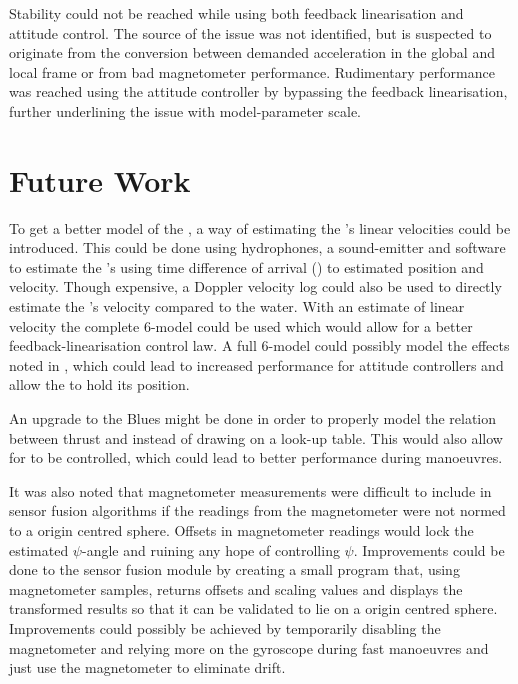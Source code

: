 Stability could not be reached while using both feedback linearisation and attitude control. The source of the issue was not identified, but is suspected to originate from the conversion between demanded acceleration in the global and local frame or from bad magnetometer performance. Rudimentary performance was reached using the attitude controller by bypassing the feedback linearisation, further underlining the issue with model-parameter scale.
\section{Future Work}
To get a better model of the \abbrROV, a way of estimating the \abbrROV's linear velocities could be introduced. This could be done using hydrophones, a sound-emitter and software to estimate the \abbrROV's using time difference of arrival (\abbrTDOA) to estimated position and velocity. Though expensive, a Doppler velocity log could also be used to directly estimate the \abbrROV's velocity compared to the water.
With an estimate of linear velocity the complete 6-\abbrDOF model could be used which would allow for a better feedback-linearisation control law. A full 6-\abbrDOF model could possibly model the effects noted in , which could lead to increased performance for attitude controllers and allow the \abbrROV to hold its position.

An upgrade to the Blue\abbrESC{}s might be done in order to properly model the relation between thrust and \abbrRPM instead of drawing on a look-up table. This would also allow for \abbrRPM to be controlled, which could lead to better performance during manoeuvres. 

It was also noted that magnetometer measurements were difficult to include in sensor fusion algorithms if the readings from the magnetometer were not normed to a origin centred sphere. Offsets in magnetometer readings would lock the estimated $\psi$-angle and ruining any hope of controlling $\psi$. Improvements could be done to the sensor fusion module by creating a small program that, using magnetometer samples, returns offsets and scaling values and displays the transformed results so that it can be validated to lie on a origin centred sphere.
Improvements could possibly be achieved by temporarily disabling the magnetometer and relying more on the gyroscope during fast manoeuvres and just use the magnetometer to eliminate drift. 